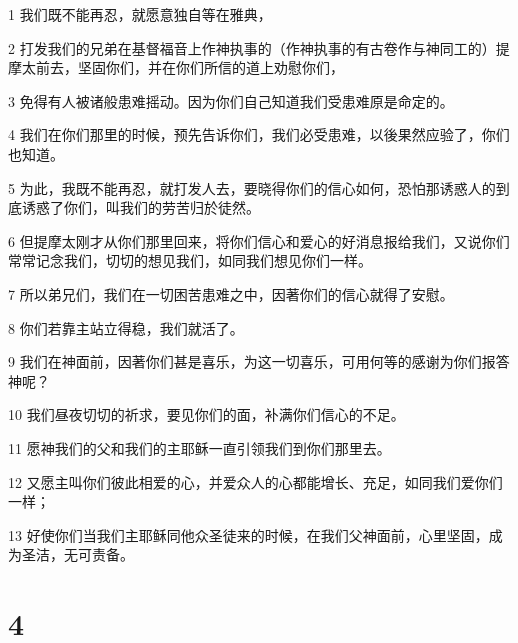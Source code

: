 \par 1 我们既不能再忍，就愿意独自等在雅典，
\par 2 打发我们的兄弟在基督福音上作神执事的（作神执事的有古卷作与神同工的）提摩太前去，坚固你们，并在你们所信的道上劝慰你们，
\par 3 免得有人被诸般患难摇动。因为你们自己知道我们受患难原是命定的。
\par 4 我们在你们那里的时候，预先告诉你们，我们必受患难，以後果然应验了，你们也知道。
\par 5 为此，我既不能再忍，就打发人去，要晓得你们的信心如何，恐怕那诱惑人的到底诱惑了你们，叫我们的劳苦归於徒然。
\par 6 但提摩太刚才从你们那里回来，将你们信心和爱心的好消息报给我们，又说你们常常记念我们，切切的想见我们，如同我们想见你们一样。
\par 7 所以弟兄们，我们在一切困苦患难之中，因著你们的信心就得了安慰。
\par 8 你们若靠主站立得稳，我们就活了。
\par 9 我们在神面前，因著你们甚是喜乐，为这一切喜乐，可用何等的感谢为你们报答神呢？
\par 10 我们昼夜切切的祈求，要见你们的面，补满你们信心的不足。
\par 11 愿神我们的父和我们的主耶稣一直引领我们到你们那里去。
\par 12 又愿主叫你们彼此相爱的心，并爱众人的心都能增长、充足，如同我们爱你们一样；
\par 13 好使你们当我们主耶稣同他众圣徒来的时候，在我们父神面前，心里坚固，成为圣洁，无可责备。

\chapter{4}

